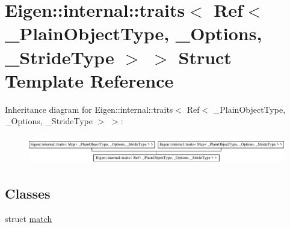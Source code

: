 \hypertarget{struct_eigen_1_1internal_1_1traits_3_01_ref_3_01___plain_object_type_00_01___options_00_01___stride_type_01_4_01_4}{}\section{Eigen\+:\+:internal\+:\+:traits$<$ Ref$<$ \+\_\+\+Plain\+Object\+Type, \+\_\+\+Options, \+\_\+\+Stride\+Type $>$ $>$ Struct Template Reference}
\label{struct_eigen_1_1internal_1_1traits_3_01_ref_3_01___plain_object_type_00_01___options_00_01___stride_type_01_4_01_4}
Inheritance diagram for Eigen\+:\+:internal\+:\+:traits$<$ Ref$<$ \+\_\+\+Plain\+Object\+Type, \+\_\+\+Options, \+\_\+\+Stride\+Type $>$ $>$\+:\begin{figure}[H]
\begin{center}
\leavevmode
\includegraphics[height=1.266968cm]{struct_eigen_1_1internal_1_1traits_3_01_ref_3_01___plain_object_type_00_01___options_00_01___stride_type_01_4_01_4}
\end{center}
\end{figure}
\subsection*{Classes}
\begin{DoxyCompactItemize}
\item 
struct \hyperlink{struct_eigen_1_1internal_1_1traits_3_01_ref_3_01___plain_object_type_00_01___options_00_01___stride_type_01_4_01_4_1_1match}{match}
\end{DoxyCompactItemize}
